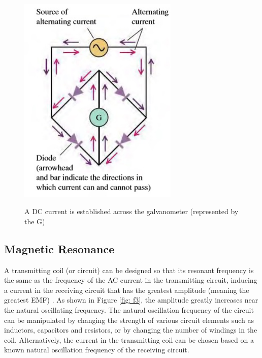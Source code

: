 \begin{figure}
    \begin{center}
    \includegraphics[width=3in]{fig2.jpg}
    \end{center}
    \renewcommand{\baselinestretch}{1}
    \small\normalsize
    \begin{quote}
    \caption[A DC current is established across the galvanometer]{A DC current is established across the galvanometer (represented by the G) \cite{young_university_2016}} \label{fig: f2}
    \end{quote}
\end{figure}

\subsection{Magnetic Resonance}
A transmitting coil (or circuit) can be designed so that its resonant frequency is the same as the frequency of 
the AC current in the transmitting circuit, inducing a current in the receiving circuit that has the greatest 
amplitude (meaning the greatest EMF) \cite{young_university_2016}. As shown in Figure \ref{fig: f3}, the amplitude greatly 
increases near the natural oscillating frequency. The natural oscillation frequency of the circuit can be manipulated 
by changing the strength of various circuit elements such as inductors, capacitors and resistors, or by changing the 
number of windings in the coil.  Alternatively, the current in the transmitting coil can be chosen based on a known 
natural oscillation frequency of the receiving circuit.

